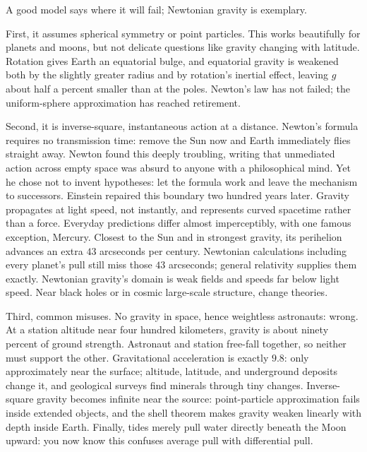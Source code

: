 
A good model says where it will fail; Newtonian gravity is exemplary.

First, it assumes spherical symmetry or point particles. This works beautifully for planets and moons, but not delicate questions like gravity changing with latitude. Rotation gives Earth an equatorial bulge, and equatorial gravity is weakened both by the slightly greater radius and by rotation's inertial effect, leaving \(g\) about half a percent smaller than at the poles. Newton's law has not failed; the uniform-sphere approximation has reached retirement.

Second, it is inverse-square, instantaneous action at a distance. Newton's formula requires no transmission time: remove the Sun now and Earth immediately flies straight away. Newton found this deeply troubling, writing that unmediated action across empty space was absurd to anyone with a philosophical mind. Yet he chose not to invent hypotheses: let the formula work and leave the mechanism to successors. Einstein repaired this boundary two hundred years later. Gravity propagates at light speed, not instantly, and represents curved spacetime rather than a force. Everyday predictions differ almost imperceptibly, with one famous exception, Mercury. Closest to the Sun and in strongest gravity, its perihelion advances an extra \(43\) arcseconds per century. Newtonian calculations including every planet's pull still miss those \(43\) arcseconds; general relativity supplies them exactly. Newtonian gravity's domain is weak fields and speeds far below light speed. Near black holes or in cosmic large-scale structure, change theories.

Third, common misuses. No gravity in space, hence weightless astronauts: wrong. At a station altitude near four hundred kilometers, gravity is about ninety percent of ground strength. Astronaut and station free-fall together, so neither must support the other. Gravitational acceleration is exactly \(9.8\): only approximately near the surface; altitude, latitude, and underground deposits change it, and geological surveys find minerals through tiny changes. Inverse-square gravity becomes infinite near the source: point-particle approximation fails inside extended objects, and the shell theorem makes gravity weaken linearly with depth inside Earth. Finally, tides merely pull water directly beneath the Moon upward: you now know this confuses average pull with differential pull.


